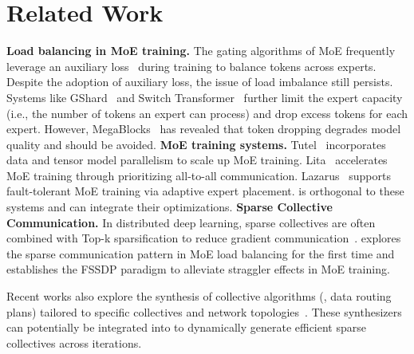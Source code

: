 \section{Related Work}\label{sec:related}

\textbf{Load balancing in MoE training.}
The gating algorithms of MoE frequently leverage an auxiliary loss~\cite{lepikhin2020gshard}
during training to balance tokens across experts. Despite the adoption of
auxiliary loss, the issue of load imbalance still persists. Systems like GShard~\cite{lepikhin2020gshard}
and Switch Transformer~\cite{fedus2022switch} further limit the expert capacity (i.e., the number of
tokens an expert can process) and drop excess tokens for each expert. However,
MegaBlocks~\cite{gale2022megablocks} has revealed that token dropping degrades model quality and should be
avoided.
\newline
\textbf{MoE training systems.}
Tutel~\cite{hwang2022tutel} incorporates data and tensor model parallelism to scale up MoE training.
Lita~\cite{li2022lita} accelerates MoE training through prioritizing all-to-all communication.
Lazarus~\cite{wu2024lazarus} supports fault-tolerant MoE training via adaptive expert placement.
\xxx is orthogonal to these systems and can integrate their optimizations.
\newline
\textbf{Sparse Collective Communication.}
In distributed deep learning, sparse collectives are often combined with Top-k sparsification to reduce gradient communication~\cite{peng2024sparse, zhao2024spardl, li2022near, renggli2019sparcml, shi2019distributed}.
\xxx explores the sparse communication pattern in MoE load balancing for the first time and establishes the FSSDP paradigm to alleviate straggler effects in MoE training.

Recent works also explore the synthesis of collective algorithms (\ie, data routing plans) tailored to specific collectives and network topologies~\cite{cai2021msccl,shah2023taccl,kim2024tccl,wang2020blink,cowan2022gc3}.
These synthesizers can potentially be integrated into \xxx to dynamically generate efficient sparse collectives across iterations.
